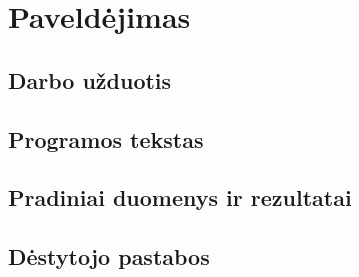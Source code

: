 \documentclass{article}
\begin{document}

\section{Paveldėjimas}
\subsection{Darbo užduotis}
\subsection{Programos tekstas}
\subsection{Pradiniai duomenys ir rezultatai}
\subsection{Dėstytojo pastabos}
\newpage
\end{document}
